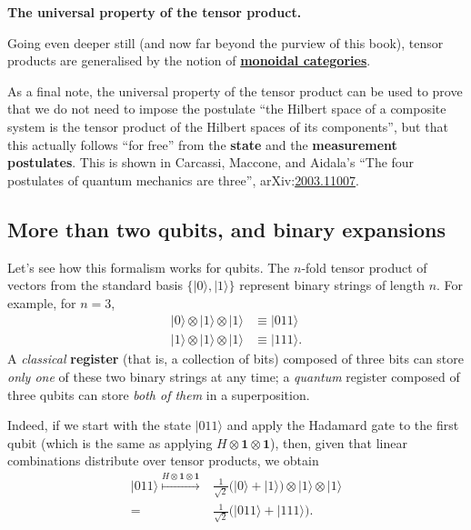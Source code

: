 \documentclass[fleqn,a4paper]{article}
\newenvironment{technical}[1]{\textbf{#1.}\par\vspace{.5\baselineskip}\everypar{\setlength{\parindent}{1.5em}}}{}
\theoremstyle{definition}
\theoremstyle{definition}
\theoremstyle{definition}
\theoremstyle{definition}
\theoremstyle{remark}
\begin{document}
\begin{technical}{The universal property of the tensor product}
Going even deeper still (and now far beyond the purview of this book), tensor products are generalised by the notion of \href{https://en.wikipedia.org/wiki/Monoidal_category}{\textbf{monoidal categories}}.

As a final note, the universal property of the tensor product can be used to prove that we do not need to impose the postulate ``the Hilbert space of a composite system is the tensor product of the Hilbert spaces of its components'', but that this actually follows ``for free'' from the \textbf{state} and the \textbf{measurement postulates}.
This is shown in Carcassi, Maccone, and Aidala's ``The four postulates of quantum mechanics are three'', arXiv:\href{https://arxiv.org/abs/2003.11007}{2003.11007}.

\end{technical}

\hypertarget{more-than-two-qubits-and-binary}{%
\subsection{More than two qubits, and binary expansions}\label{more-than-two-qubits-and-binary}}

Let's see how this formalism works for qubits.
The \(n\)-fold tensor product of vectors from the standard basis \(\{|0\rangle,|1\rangle\}\) represent binary strings of length \(n\).
For example, for \(n=3\),
\[
  \begin{aligned}
    |0\rangle\otimes|1\rangle\otimes|1\rangle
    & \equiv |011\rangle
  \\|1\rangle\otimes|1\rangle\otimes|1\rangle
    & \equiv |111\rangle.
  \end{aligned}
\]
A \emph{classical} \textbf{register} (that is, a collection of bits) composed of three bits can store \emph{only one} of these two binary strings at any time; a \emph{quantum} register composed of three qubits can store \emph{both of them} in a superposition.

Indeed, if we start with the state \(|011\rangle\) and apply the Hadamard gate to the first qubit (which is the same as applying \(H\otimes\mathbf{1}\otimes\mathbf{1}\)), then, given that linear combinations distribute over tensor products, we obtain
\[
  \begin{aligned}
    |011\rangle
    \overset{H\otimes\mathbf{1}\otimes\mathbf{1}}{\longmapsto}
    &\frac{1}{\sqrt{2}} \big(|0\rangle + |1\rangle\big) \otimes|1\rangle\otimes|1\rangle
  \\=
    &\frac{1}{\sqrt{2}} \big(|011\rangle + |111\rangle\big).
  \end{aligned}
\]
\end{document}
